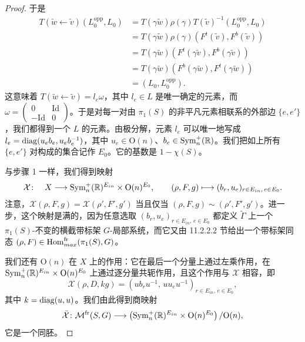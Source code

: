 \begin{proof}

于是
\begin{align*}
T(\tilde w\leftarrow\tilde v)(L_0^{\mathrm{opp}},L_0)
&=T(\gamma\tilde w)\rho(\gamma)T(\tilde v)^{-1}(L_0^{\mathrm{opp}},L_0)\\
&=T(\gamma\tilde w)\rho(\gamma)(F^{t}(\tilde v),F^{b}(\tilde v))\\
&=T(\gamma\tilde w)(F^{t}(\gamma\tilde v),F^{b}(\gamma\tilde v))\\
&=T(\gamma\tilde w)(F^{b}(\gamma\tilde w),F^{t}(\gamma\tilde w))\\
&=(L_0,L_0^{\mathrm{opp}}).
\end{align*}
这意味着 $T(\tilde w\leftarrow\tilde v)=l_e\omega$，其中 $l_e\in L$ 是唯一确定的元素，而 $\omega=\begin{pmatrix} 0 & \mathrm{Id}\\ -\mathrm{Id} & 0\end{pmatrix}$。于是对每一对由 $\pi_1(S)$ 的非平凡元素相联系的外部边 $\{e,e'\}$，我们都得到一个 $L$ 的元素。由极分解，元素 $l_e$ 可以唯一地写成 $l_e=\operatorname{diag}(u_e b_e,u_e b_e^{-1})$，其中 $u_e\in\mathrm{O}(n)$、$b_e\in\operatorname{Sym}_n^{+}(\mathbb{R})$。我们把如上所有 $\{e,e'\}$ 对构成的集合记作 $E_0$。它的基数是 $1-\chi(S)$。

与步骤 1 一样，我们得到映射
\[
\mathcal{X}\colon \quad X\longrightarrow\operatorname{Sym}_n^{+}(\mathbb{R})^{E_{in}}\times\mathrm{O}(n)^{E_0},\qquad
(\rho,F,g)\longmapsto(b_r,u_e)_{r\in E_{in},\,e\in E_0}.
\]
注意，$\mathcal{X}(\rho,F,g)=\mathcal{X}(\rho',F',g')$ 当且仅当 $(\rho,F,g)\sim(\rho',F',g')$。进一步，这个映射是满的，因为任意选取 $(b_r,u_e)_{r\in E_{in},\,e\in E_0}$ 都定义 $\tilde\Gamma$ 上一个 $\pi_1(S)$-不变的横截带标架 $G$-局部系统，而它又由 11.2.2.2 节给出一个带标架同态 $(\rho,F)\in\operatorname{Hom}^{\mathrm{fr}}_{max}(\pi_1(S),G)$。

我们还有 $\mathrm{O}(n)$ 在 $X$ 上的作用：它在最后一个分量上通过左乘作用，在 $\operatorname{Sym}_n^{+}(\mathbb{R})^{E_{in}}\times\mathrm{O}(n)^{E_0}$ 上通过逐分量共轭作用，且这个作用与 $\mathcal{X}$ 相容，即
\[
\mathcal{X}(\rho,D,kg)=(ub_r u^{-1},\,u u_e u^{-1})_{r\in E_{in},\,e\in E_0},
\]
其中 $k=\operatorname{diag}(u,u)$。我们由此得到商映射
\[
\bar{\mathcal{X}}\colon\mathcal{M}^{\mathrm{fr}}(S,G)\longrightarrow\left(\operatorname{Sym}_n^{+}(\mathbb{R})^{E_{in}}\times\mathrm{O}(n)^{E_0}\right)/\mathrm{O}(n),
\]
它是一个同胚。
\end{proof}


